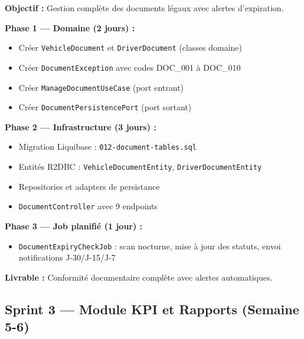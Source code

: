 \documentclass[12pt,a4paper]{report}
\begin{document}
\begin{tcolorbox}[colback=fleeterror!5, colframe=fleeterror, title={\bfseries Sprint 2 — Documents et Conformité}]
\textbf{Objectif :} Gestion complète des documents légaux avec alertes d'expiration.

\textbf{Phase 1 — Domaine (2 jours) :}
\begin{itemize}[leftmargin=1.5cm]
  \item Créer \texttt{VehicleDocument} et \texttt{DriverDocument} (classes domaine)
  \item Créer \texttt{DocumentException} avec codes DOC\_001 à DOC\_010
  \item Créer \texttt{ManageDocumentUseCase} (port entrant)
  \item Créer \texttt{DocumentPersistencePort} (port sortant)
\end{itemize}

\textbf{Phase 2 — Infrastructure (3 jours) :}
\begin{itemize}[leftmargin=1.5cm]
  \item Migration Liquibase : \texttt{012-document-tables.sql}
  \item Entités R2DBC : \texttt{VehicleDocumentEntity}, \texttt{DriverDocumentEntity}
  \item Repositories et adapters de persistance
  \item \texttt{DocumentController} avec 9 endpoints
\end{itemize}

\textbf{Phase 3 — Job planifié (1 jour) :}
\begin{itemize}[leftmargin=1.5cm]
  \item \texttt{DocumentExpiryCheckJob} : scan nocturne, mise à jour des statuts, envoi notifications J-30/J-15/J-7
\end{itemize}

\textbf{Livrable :} Conformité documentaire complète avec alertes automatiques.
\end{tcolorbox}

\subsection{Sprint 3 — Module KPI et Rapports (Semaine 5-6)}
\end{document}
